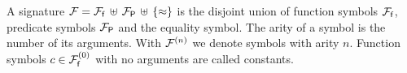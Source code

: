 
\begin{definition}\label{def:signature}
A {\myem signature} ${\mathcal F}={{\mathcal F}_{\mathsf f}}\,\uplus\,{{\mathcal F}_{\mathsf P}}\,\uplus\,\{\approx\}$ is the disjoint union 
of {\myem function symbols} ${{\mathcal F}_{\mathsf f}}$, {\myem predicate symbols} ${{\mathcal F}_{\mathsf P}}$
and the equality symbol.
The {\myem arity} of a symbol is the number of its arguments.
With ${\mathcal F^{(n)}}$ we denote symbols with arity $n$.
Function symbols $c\in{{\mathcal F}_{\mathsf f}^{(0)}}$ with no arguments are called {\myem constants}.
\end{definition}

